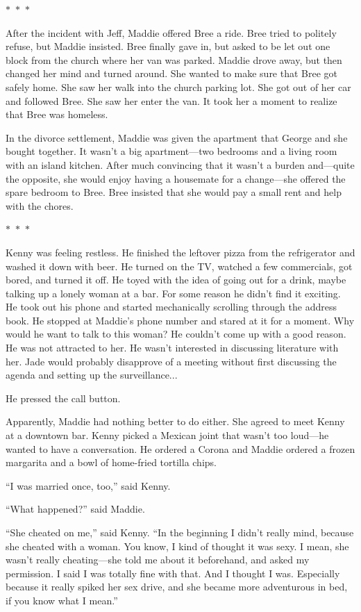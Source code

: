 \documentclass{memoir}
\newcommand{\starbreak}{%
\begin{center}
  $\ast$~$\ast$~$\ast$
\end{center}
}
\begin{document}
\starbreak

After the incident with Jeff, Maddie offered Bree a ride. Bree tried to politely refuse, but Maddie insisted. Bree finally gave in, but asked to be let out one block from the church where her van was parked. Maddie drove away, but then changed her mind and turned around. She wanted to make sure that Bree got safely home. She saw her walk into the church parking lot. She got out of her car and followed Bree. She saw her enter the van. It took her a moment to realize that Bree was homeless. 

In the divorce settlement, Maddie was given the apartment that George and she bought together. It wasn't a big apartment---two bedrooms and a living room with an island kitchen. After much convincing that it wasn't a burden and---quite the opposite, she would enjoy having a housemate for a change---she offered the spare bedroom to Bree. Bree insisted that she would pay a small rent and help with the chores. 

\starbreak

Kenny was feeling restless. He finished the leftover pizza from the refrigerator and washed it down with beer. He turned on the TV, watched a few commercials, got bored, and turned it off. He toyed with the idea of going out for a drink, maybe talking up a lonely woman at a bar. For some reason he didn't find it exciting. He took out his phone and started mechanically scrolling through the address book. He stopped at Maddie's phone number and stared at it for a moment. Why would he want to talk to this woman? He couldn't come up with a good reason. He was not attracted to her. He wasn't interested in discussing literature with her. Jade would probably disapprove of a meeting without first discussing the agenda and setting up the surveillance... 

He pressed the call button. 

Apparently, Maddie had nothing better to do either. She agreed to meet Kenny at a downtown bar. Kenny picked a Mexican joint that wasn't too loud---he wanted to have a conversation. He ordered a Corona and Maddie ordered a frozen margarita and a bowl of home-fried tortilla chips. 

``I was married once, too,'' said Kenny.

``What happened?'' said Maddie.

``She cheated on me,'' said Kenny. ``In the beginning I didn't really mind, because she cheated with a woman. You know, I kind of thought it was sexy. I mean, she wasn't really cheating---she told me about it beforehand, and asked my permission. I said I was totally fine with that. And I thought I was. Especially because it really spiked her sex drive, and she became more adventurous in bed, if you know what I mean.''
\end{document}
